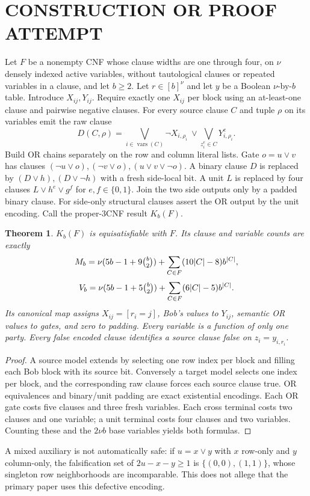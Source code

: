 \documentclass[11pt]{article}
\newtheorem{theorem}{Theorem}
\begin{document}
\section{CONSTRUCTION OR PROOF ATTEMPT}
Let $F$ be a nonempty CNF whose clause widths are one through four, on $\nu$ densely indexed active variables, without tautological clauses or repeated variables in a clause, and let $b\ge2$. Let $r\in[b]^\nu$ and let $y$ be a Boolean $\nu$-by-$b$ table. Introduce $X_{ij},Y_{ij}$. Require exactly one $X_{ij}$ per block using an at-least-one clause and pairwise negative clauses. For every source clause $C$ and tuple $\rho$ on its variables emit the raw clause
\[
 D(C,\rho)=\bigvee_{i\in\operatorname{vars}(C)}\neg X_{i,\rho_i}\ \vee\!\bigvee_{z_i^e\in C}Y_{i,\rho_i}^e.
\]
Build OR chains separately on the row and column literal lists. Gate $o=u\vee v$ has clauses $(\neg u\vee o),(\neg v\vee o),(u\vee v\vee\neg o)$. A binary clause $D$ is replaced by $(D\vee h),(D\vee\neg h)$ with a fresh side-local bit. A unit $L$ is replaced by four clauses $L\vee h^e\vee g^f$ for $e,f\in\{0,1\}$. Join the two side outputs only by a padded binary clause. For side-only structural clauses assert the OR output by the unit encoding. Call the proper-3CNF result $K_b(F)$.
\begin{theorem}
$K_b(F)$ is equisatisfiable with $F$. Its clause and variable counts are exactly
\[
 M_b=\nu(5b-1+9\tbinom b2)+\sum_{C\in F}(10|C|-8)b^{|C|},
\]
\[
 V_b=\nu(5b-1+5\tbinom b2)+\sum_{C\in F}(6|C|-5)b^{|C|}.
\]
Its canonical map assigns $X_{ij}=[r_i=j]$, Bob's values to $Y_{ij}$, semantic OR values to gates, and zero to padding. Every variable is a function of only one party. Every false encoded clause identifies a source clause false on $z_i=y_{i,r_i}$.
\end{theorem}
\begin{proof}
A source model extends by selecting one row index per block and filling each Bob block with its source bit. Conversely a target model selects one index per block, and the corresponding raw clause forces each source clause true. OR equivalences and binary/unit padding are exact existential encodings. Each OR gate costs five clauses and three fresh variables. Each cross terminal costs two clauses and one variable; a unit terminal costs four clauses and two variables. Counting these and the $2\nu b$ base variables yields both formulas.
\end{proof}
A mixed auxiliary is not automatically safe: if $u=x\vee y$ with $x$ row-only and $y$ column-only, the falsification set of $2u-x-y\ge1$ is $\{(0,0),(1,1)\}$, whose singleton row neighborhoods are incomparable. This does not allege that the primary paper uses this defective encoding.
\end{document}
